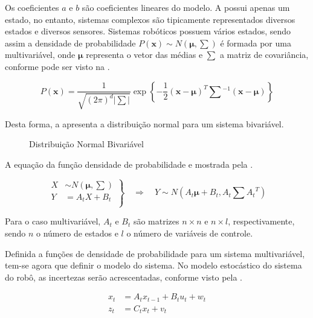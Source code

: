 Os coeficientes $a$ e $b$ são coeficientes lineares do modelo. A  possui apenas um estado, no entanto, sistemas complexos são tipicamente representados diversos estados e diversos sensores.
Sistemas robóticos possuem vários estados, sendo assim a densidade de probabilidade ${P(\mathbf{x}) \sim N(\boldsymbol{\mu}, \textstyle\sum)}$ é formada por uma  multivariável, onde $\boldsymbol{\mu}$ representa o vetor das médias e ${\textstyle\sum}$ a matriz de covariância, conforme pode ser visto na  .

\begin{equation}
    \label{eq::linearNd}
    P(\mathbf{x}) =\frac{1}{\sqrt{(2\pi)^{d}|\sum|}}\exp\left\{-\frac{1}{2} (\mathbf{x}-\boldsymbol\mu)^T\textstyle\sum{}^{-1}(\mathbf{x}-\boldsymbol\mu)\right\}
\end{equation}

Desta forma, a  apresenta a distribuição normal para um sistema bivariável.

\begin{figure}[!ht]
    \centering
    
    \caption{Distribuição Normal Bivariável}
    \label{fig::gauss2}
\end{figure}

A equação da função densidade de probabilidade e mostrada pela .

\begin{equation}
    \left.
    \begin{aligned}
            X & \sim N\left(\boldsymbol\mu, \textstyle\sum\right)\\
            Y & = {A}_tX + {B_t}\\
    \end{aligned} \right\}
    \quad \Rightarrow \quad Y \sim N\left( {A_t}\boldsymbol\mu+B_t, {A_t}\textstyle\sum {A_t}^T \right)
    \label{eq:multi}
\end{equation}

Para o caso multivariável, ${A_t}$ e ${B_t}$ são matrizes $n \times n$ e $n \times l$, respectivamente, sendo $n$ o número de estados e $l$ o número de variáveis de controle.

Definida a funções de densidade de probabilidade para um sistema multivariável, tem-se agora que definir o modelo do sistema. No modelo estocástico do sistema do robô, as incertezas serão acrescentadas, conforme visto pela  .

    \begin{equation} 
        \label{eq::mdinamic}
        \begin{aligned}
            x_t &= {A}_t x_{t-1} + {B}_t u_t +  w_t\\ 
        z_t &= {C}_t x_t + v_t
        \end{aligned}
    \end{equation}


